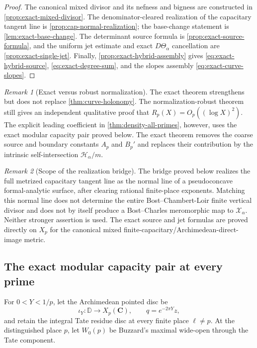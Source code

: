 \documentclass[11pt]{article}
\theoremstyle{definition}
\theoremstyle{remark}
\newtheorem{remark}[remark]{Remark}
\newcommand{\C}{\mathbf C}
\newcommand{\Energy}{\mathscr H}
\begin{document}
\begin{proof}
The canonical mixed divisor and its nefness and bigness are constructed in
\cref{prop:exact-mixed-divisor}.  The denominator-cleared realization of the
capacitary tangent line is \cref{prop:cap-normal-realization}; the base-change
statement is \cref{lem:exact-base-change}.  The determinant source formula is
\cref{prop:exact-source-formula}, and the uniform jet estimate and exact
$D\Theta_\alpha$ cancellation are
\cref{prop:exact-single-jet}.  Finally,
\cref{prop:exact-hybrid-assembly} gives
\eqref{eq:exact-hybrid-source}, \eqref{eq:exact-degree-sum}, and the slopes
assembly \eqref{eq:exact-curve-slopes}.
\end{proof}

\begin{remark}[Exact versus robust normalization]
The exact theorem strengthens but does not replace
\cref{thm:curve-holonomy}.  The normalization-robust theorem still gives an
independent qualitative proof that $R_p(X)=O_p((\log X)^2)$.  The explicit
leading coefficient in \cref{thm:density-all-primes}, however, uses the exact
modular capacity pair proved below.  The exact theorem removes the coarse
source and boundary constants $A_p$ and $B_p'$ and replaces their contribution
by the intrinsic self-intersection $\Energy_\alpha/m$.
\end{remark}

\begin{remark}[Scope of the realization bridge]
The bridge proved below realizes the full metrized capacitary tangent line as
the normal line of a pseudoconcave formal-analytic surface, after clearing
rational finite-place exponents.  Matching this normal line does not determine
the entire Bost--Chambert-Loir finite vertical divisor and does not by itself
produce a Bost--Charles meromorphic map to $\mathscr X_\alpha$.  Neither
stronger assertion is used.  The exact source and jet formulas are proved
directly on $X_p$ for the canonical mixed finite-capacitary/Archimedean-direct-
image metric.
\end{remark}


\subsection{The exact modular capacity pair at every prime}
\label{sec:allprime-capacity}

For $0<Y<1/p$, let the Archimedean pointed disc be
\begin{equation}\label{eq:allprime-qdisc}
 \iota_Y:\mathbb D\longrightarrow X_p(\C),
 \qquad q=e^{-2\pi Y}z,
\end{equation}
and retain the integral Tate residue disc at every finite place $\ell\ne p$.
At the distinguished place $p$, let $W_0(p)$ be Buzzard's maximal wide-open
through the Tate component.
\end{document}
